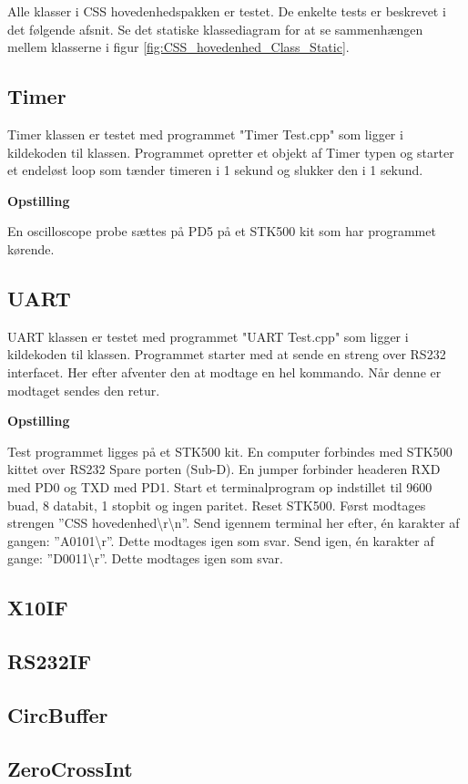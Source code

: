 Alle klasser i CSS hovedenhedspakken er testet. De enkelte tests er beskrevet i det følgende afsnit.
Se det statiske klassediagram for at se sammenhængen mellem klasserne i figur \ref{fig:CSS_hovedenhed_Class_Static}.

\subsection{Timer}
Timer klassen er testet med programmet "Timer Test.cpp" som ligger i kildekoden til klassen.
Programmet opretter et objekt af Timer typen og starter et endeløst loop som tænder timeren i 1 sekund og slukker den i 1 sekund.

\textbf{Opstilling}

En oscilloscope probe sættes på PD5 på et STK500 kit som har programmet kørende.




\subsection{UART}
UART klassen er testet med programmet "UART Test.cpp" som ligger i kildekoden til klassen.
Programmet starter med at sende en streng over RS232 interfacet. Her efter afventer den at modtage en hel kommando. Når denne er modtaget sendes den retur.

\textbf{Opstilling}

Test programmet ligges på et STK500 kit.
En computer forbindes med STK500 kittet over RS232 Spare porten (Sub-D).
En jumper forbinder headeren RXD med PD0 og TXD med PD1.
Start et terminalprogram op indstillet til 9600 buad, 8 databit, 1 stopbit og ingen paritet.
Reset STK500. Først modtages strengen ''CSS hovedenhed\textbackslash r\textbackslash n''.
Send igennem terminal her efter, én karakter af gangen: ''A0101\textbackslash r''. Dette modtages igen som svar.
Send igen, én karakter af gange: ''D0011\textbackslash r''. Dette modtages igen som svar.

\subsection{X10IF}


\subsection{RS232IF}

\subsection{CircBuffer}

\subsection{ZeroCrossInt}
